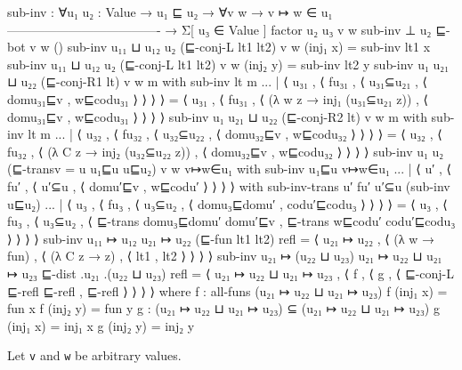 \begin{fence}
\begin{code}
sub-inv : ∀{u₁ u₂ : Value}
        → u₁ ⊑ u₂
        → ∀{v w} → v ↦ w ∈ u₁
          -------------------------------------
        → Σ[ u₃ ∈ Value ] factor u₂ u₃ v w
sub-inv {⊥} {u₂} ⊑-bot {v} {w} ()
sub-inv {u₁₁ ⊔ u₁₂} {u₂} (⊑-conj-L lt1 lt2) {v} {w} (inj₁ x) = sub-inv lt1 x
sub-inv {u₁₁ ⊔ u₁₂} {u₂} (⊑-conj-L lt1 lt2) {v} {w} (inj₂ y) = sub-inv lt2 y
sub-inv {u₁} {u₂₁ ⊔ u₂₂} (⊑-conj-R1 lt) {v} {w} m
    with sub-inv lt m
... | ⟨ u₃₁ , ⟨ fu₃₁ , ⟨ u₃₁⊆u₂₁ , ⟨ domu₃₁⊑v , w⊑codu₃₁ ⟩ ⟩ ⟩ ⟩ =
      ⟨ u₃₁ , ⟨ fu₃₁ , ⟨ (λ {w} z → inj₁ (u₃₁⊆u₂₁ z)) ,
                                   ⟨ domu₃₁⊑v , w⊑codu₃₁ ⟩ ⟩ ⟩ ⟩
sub-inv {u₁} {u₂₁ ⊔ u₂₂} (⊑-conj-R2 lt) {v} {w} m
    with sub-inv lt m
... | ⟨ u₃₂ , ⟨ fu₃₂ , ⟨ u₃₂⊆u₂₂ , ⟨ domu₃₂⊑v , w⊑codu₃₂ ⟩ ⟩ ⟩ ⟩ =
      ⟨ u₃₂ , ⟨ fu₃₂ , ⟨ (λ {C} z → inj₂ (u₃₂⊆u₂₂ z)) ,
                                   ⟨ domu₃₂⊑v , w⊑codu₃₂ ⟩ ⟩ ⟩ ⟩
sub-inv {u₁} {u₂} (⊑-trans{v = u} u₁⊑u u⊑u₂) {v} {w} v↦w∈u₁
    with sub-inv u₁⊑u v↦w∈u₁
... | ⟨ u′ , ⟨ fu′ , ⟨ u′⊆u , ⟨ domu′⊑v , w⊑codu′ ⟩ ⟩ ⟩ ⟩
    with sub-inv-trans {u′} fu′ u′⊆u (sub-inv u⊑u₂)
... | ⟨ u₃ , ⟨ fu₃ , ⟨ u₃⊆u₂ , ⟨ domu₃⊑domu′ , codu′⊑codu₃ ⟩ ⟩ ⟩ ⟩ =
      ⟨ u₃ , ⟨ fu₃ , ⟨ u₃⊆u₂ , ⟨ ⊑-trans domu₃⊑domu′ domu′⊑v ,
                                    ⊑-trans w⊑codu′ codu′⊑codu₃ ⟩ ⟩ ⟩ ⟩
sub-inv {u₁₁ ↦ u₁₂} {u₂₁ ↦ u₂₂} (⊑-fun lt1 lt2) refl =
    ⟨ u₂₁ ↦ u₂₂ , ⟨ (λ {w} → fun) , ⟨ (λ {C} z → z) , ⟨ lt1 , lt2 ⟩ ⟩ ⟩ ⟩
sub-inv {u₂₁ ↦ (u₂₂ ⊔ u₂₃)} {u₂₁ ↦ u₂₂ ⊔ u₂₁ ↦ u₂₃} ⊑-dist
    {.u₂₁} {.(u₂₂ ⊔ u₂₃)} refl =
    ⟨ u₂₁ ↦ u₂₂ ⊔ u₂₁ ↦ u₂₃ , ⟨ f , ⟨ g , ⟨ ⊑-conj-L ⊑-refl ⊑-refl , ⊑-refl ⟩ ⟩ ⟩ ⟩
  where f : all-funs (u₂₁ ↦ u₂₂ ⊔ u₂₁ ↦ u₂₃)
        f (inj₁ x) = fun x
        f (inj₂ y) = fun y
        g : (u₂₁ ↦ u₂₂ ⊔ u₂₁ ↦ u₂₃) ⊆ (u₂₁ ↦ u₂₂ ⊔ u₂₁ ↦ u₂₃)
        g (inj₁ x) = inj₁ x
        g (inj₂ y) = inj₂ y
\end{code}
\end{fence}

Let \texttt{v} and \texttt{w} be arbitrary values.

